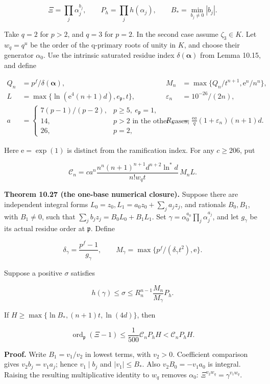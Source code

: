 \documentclass[
  11pt,
  a4paper,
]{article}
\begin{document}
\[
\Xi=\prod_j\alpha_j^{b_j},\qquad
P_h=\prod_jh(\alpha_j),\qquad
B_* =\min_{b_j\ne0}|b_j|.
\tag{10.73}
\]

Take \(q=2\) for \(p>2\), and \(q=3\) for \(p=2\). In the second case
assume \(\zeta_3\in K\). Let \(w_q=q^u\) be the order of the q-primary
roots of unity in \(K\), and choose their generator \(\alpha_0\). Use
the intrinsic saturated residue index \(\delta(\boldsymbol\alpha)\) from
Lemma 10.15, and define

\[
\begin{aligned}
Q_n&=p^f/\delta(\boldsymbol\alpha),&
M_n&=\max\{Q_n/t^{n+1},\mathrm e^n/n^n\},\\
L&=\max\{\ln(\mathrm e^4(n+1)d),e_{\mathfrak p},t\},&
\varepsilon_n&=10^{-26}/(2n),\\
a&=\begin{cases}
7(p-1)/(p-2),&p\ge5,\ e_{\mathfrak p}=1,\\
14,&p>2\text{ in the other cases},\\
26,&p=2,
\end{cases}&
R_n&=\frac{\mathrm e a}{q}(1+\varepsilon_n)(n+1)d.
\end{aligned}
\tag{10.74}
\]

Here \(\mathrm e=\exp(1)\) is distinct from the ramification index. For
any \(c\ge206\), put

\[
\mathcal C_n=
c a^n\frac{n^n(n+1)^{n+1}d^{n+2}\ln^*d}
{n!w_qt}\,M_nL.
\tag{10.75}
\]

\textbf{Theorem 10.27 (the one-base numerical closure).} Suppose there
are independent integral forms \(L_0=z_0,L_1=a_0z_0+\sum_ja_jz_j\), and
rationals \(B_0,B_1\), with \(B_1\ne0\), such that
\(\sum_jb_jz_j=B_0L_0+B_1L_1\). Set
\(\gamma=\alpha_0^{a_0}\prod_j\alpha_j^{a_j}\), and let \(g_\gamma\) be
its actual residue order at \(\mathfrak p\). Define

\[
\delta_\gamma=\frac{p^f-1}{g_\gamma},\qquad
M_\gamma=\max\{p^f/(\delta_\gamma t^2),\mathrm e\}.
\tag{10.76}
\]

Suppose a positive \(\sigma\) satisfies

\[
h(\gamma)\le\sigma\le
R_n^{n-1}\frac{M_n}{M_\gamma}P_h.
\tag{10.77}
\]

If \(H\ge\max\{\ln B_*,(n+1)t,\ln(4d)\}\), then

\[
\operatorname{ord}_{\mathfrak p}(\Xi-1)
\le\frac1{500}\mathcal C_nP_hH
<\mathcal C_nP_hH.
\tag{10.78}
\]

\textbf{Proof.} Write \(B_1=v_1/v_2\) in lowest terms, with \(v_2>0\).
Coefficient comparison gives \(v_2b_j=v_1a_j\); hence \(v_1\mid b_j\)
and \(|v_1|\le B_*\). Also \(v_2B_0=-v_1a_0\) is integral. Raising the
resulting multiplicative identity to \(w_q\) removes \(\alpha_0\):
\(\Xi^{v_2w_q}=\gamma^{v_1w_q}\).
\end{document}
